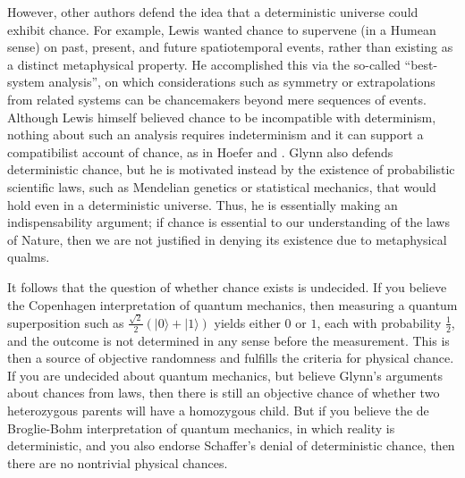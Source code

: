 \documentclass[letterpaper,12pt]{article}
\begin{document}
However, other authors defend the idea that a deterministic universe could exhibit chance. For example, Lewis wanted chance to supervene (in a Humean sense) on past, present, and future spatiotemporal events, rather than existing as a distinct metaphysical property. He accomplished this via the so-called ``best-system analysis'', on which considerations such as symmetry or extrapolations from related systems can be chancemakers beyond mere sequences of events. Although Lewis himself believed chance to be incompatible with determinism, nothing about such an analysis requires indeterminism and it can support a compatibilist account of chance, as in Hoefer and \cite{Eagle2011-EAGDC}. Glynn also defends deterministic chance, but he is motivated instead by the existence of probabilistic scientific laws, such as Mendelian genetics or statistical mechanics, that would hold even in a deterministic universe. Thus, he is essentially making an indispensability argument; if chance is essential to our understanding of the laws of Nature, then we are not justified in denying its existence due to metaphysical qualms.

It follows that the question of whether chance exists is undecided. If you believe the Copenhagen interpretation of quantum mechanics, then measuring a quantum superposition such as $\frac{\sqrt{2}}{2}(|0\rangle + |1\rangle)$ yields either $0$ or $1$, each with probability $\frac{1}{2}$, and the outcome is not determined in any sense before the measurement. This is then a source of objective randomness and fulfills the criteria for physical chance. If you are undecided about quantum mechanics, but believe Glynn's arguments about chances from laws, then there is still an objective chance of whether two heterozygous parents will have a homozygous child. But if you believe the de Broglie-Bohm interpretation of quantum mechanics, in which reality is deterministic, and you also endorse Schaffer's denial of deterministic chance, then there are no nontrivial physical chances.
\end{document}
